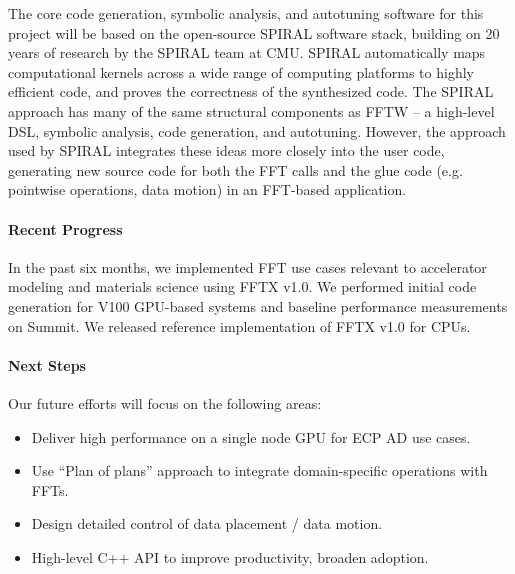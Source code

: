 The core code generation, symbolic analysis, and autotuning software for this project will be based on the open-source SPIRAL software stack,
building on 20 years of research by the SPIRAL team at CMU.
SPIRAL automatically maps computational kernels across a wide range of computing platforms to highly efficient code, and proves the correctness of the synthesized code.
The SPIRAL approach has many of the same structural components as FFTW -- a high-level DSL, symbolic analysis, code generation, and autotuning. However, the approach used by SPIRAL integrates these ideas more closely into the user code, generating new source code for both the FFT calls and the glue code (e.g. pointwise operations, data motion) in an FFT-based application.


\paragraph{Recent Progress}
In the past six months, we implemented FFT use cases relevant to
 accelerator modeling and materials science using FFTX v1.0. We performed 
 initial code generation for V100 GPU-based systems and baseline performance
 measurements on Summit. We released reference implementation of FFTX v1.0
 for CPUs.

\paragraph{Next Steps} Our future efforts will focus on the following areas:
\begin{itemize}
\item Deliver high performance on a single node GPU for ECP AD use cases.
\item Use ``Plan of plans'' approach to integrate domain-specific operations
  with FFTs. 
\item Design detailed control of data placement / data motion.
\item High-level C++ API to improve productivity, broaden adoption.
\end{itemize}


